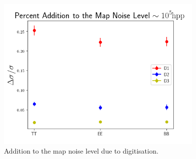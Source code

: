\documentclass[apj]{emulateapj}
\begin{document}


\begin{figure}[htb]\centering
\includegraphics[width=0.9\textwidth,clip]{Plots/addednoise.png}
  \caption[Current ]{
  Addition to the map noise level due to digitisation. 
           \label{fig:extranoise}
  }
\end{figure}
\end{document}
